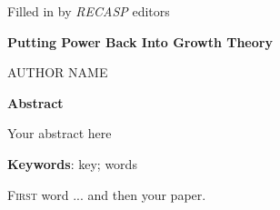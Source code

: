 \documentclass[12pt]{extarticle}
\date{}
\begin{document}

\bigskip
\bigskip
\bigskip
\bigskip

\begin{adjustwidth}{-5em}{0em}



{\selectfont 
\underline{} 


\footnotesize Filled in by \textit{RECASP} editors
}

\end{adjustwidth}



\bigskip
\bigskip
\bigskip
\bigskip

{\selectfont 
\centerline{ \huge{ \textbf{Putting Power Back Into Growth Theory}\Large \footnotemark}}
}




\bigskip
\bigskip


\centerline{ \Large AUTHOR NAME}

\bigskip
\bigskip
\bigskip

\thispagestyle{fancy}

\bigskip
\bigskip
\bigskip


\noindent \textbf{Abstract}


Your abstract here

\bigskip

{\selectfont 
\textbf{Keywords}: key; words}

\bigskip
\bigskip


\newpage

\lettrine[lines=3]{F}{irst } word ... and then your paper. 


\end{document}
